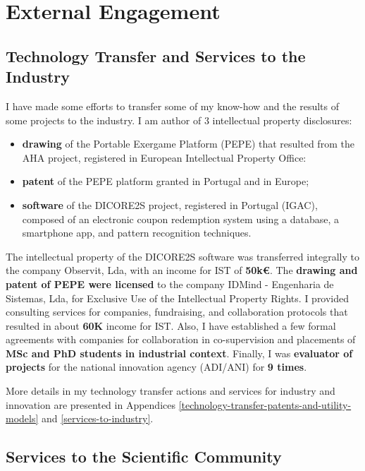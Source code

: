 \section{External Engagement}\label{external-engagement}

\subsection{Technology Transfer and Services to the
Industry}\label{technology-transfer-and-services-to-the-industry}

I have made some efforts to transfer some of my know-how and the results
of some projects to the industry. I am author of 3 intellectual property
disclosures:

\begin{itemize}
\item
  \textbf{drawing} of the Portable Exergame Platform (PEPE) that
  resulted from the AHA project, registered in European Intellectual
  Property Office:
\item
  \textbf{patent} of the PEPE platform granted in Portugal and in
  Europe;
\item
  \textbf{software} of the DICORE2S project, registered in Portugal
  (IGAC), composed of an electronic coupon redemption system using a
  database, a smartphone app, and pattern recognition techniques.
\end{itemize}

The intellectual property of the DICORE2S software was transferred
integrally to the company Observit, Lda, with an income for IST of
\textbf{50k€}. The \textbf{drawing and patent of PEPE were licensed} to
the company IDMind - Engenharia de Sistemas, Lda, for Exclusive Use of
the Intellectual Property Rights. I provided consulting services for
companies, fundraising, and collaboration protocols that resulted in
about \textbf{60K} income for IST. Also, I have established a few formal
agreements with companies for collaboration in co-supervision and
placements of \textbf{MSc and PhD students in industrial context}.
Finally, I was \textbf{evaluator of projects} for the national
innovation agency (ADI/ANI) for \textbf{9 times}.

More details in my technology transfer actions and services for industry
and innovation are presented in Appendices \ref{technology-transfer-patents-and-utility-models} and \ref{services-to-industry}.

\subsection{Services to the Scientific
Community}\label{services-to-the-scientific-community}

